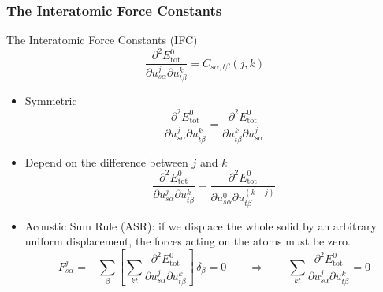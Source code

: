 \begin{frame}
  \frametitle{The Interatomic Force Constants}
  The Interatomic Force Constants (IFC)
  \begin{equation*}
    \frac{
      \partial^2 E^0_{\text{tot}}
    }{
      \partial {u}_{s\alpha}^j
      \partial {u}_{t\beta}^k
    }
    =
    C_{s\alpha, t\beta}(j, k)
  \end{equation*}

  \begin{itemize}
  \item Symmetric
    \begin{equation*}
        \frac{
        \partial^2 E^0_{\text{tot}}
        }{
        \partial {u}_{s\alpha}^j
        \partial {u}_{t\beta}^k
        }
        =
        \frac{
        \partial^2 E^0_{\text{tot}}
        }{
        \partial {u}_{t\beta}^k
        \partial {u}_{s\alpha}^j
        }
    \end{equation*}
  \item Depend on the difference between $j$ and $k$
    \begin{equation*}
        \frac{
        \partial^2 E^0_{\text{tot}}
        }{
        \partial {u}_{s\alpha}^j
        \partial {u}_{t\beta}^k
        }
        =
        \frac{
        \partial^2 E^0_{\text{tot}}
        }{
        \partial {u}_{s\alpha}^0
        \partial {u}_{t\beta}^{(k-j)}
        }
    \end{equation*}
  \item Acoustic Sum Rule (ASR): if we displace the whole solid by an arbitrary uniform
    displacement, the forces acting on the atoms must be zero.
    \begin{equation*}
      F_{s\alpha}^j =
      - \sum_{\beta}
      \left[
        \sum_{kt}
        \frac{
        \partial^2 E^0_{\text{tot}}
        }{
        \partial {u}_{s\alpha}^j
        \partial {u}_{t\beta}^k
        }
      \right]
      \,
      \delta_\beta
      = 0
      \qquad\Rightarrow\qquad
      \sum_{kt}
        \frac{
        \partial^2 E^0_{\text{tot}}
        }{
        \partial {u}_{s\alpha}^j
        \partial {u}_{t\beta}^k
        } = 0
      \end{equation*}
  \end{itemize}
\end{frame}